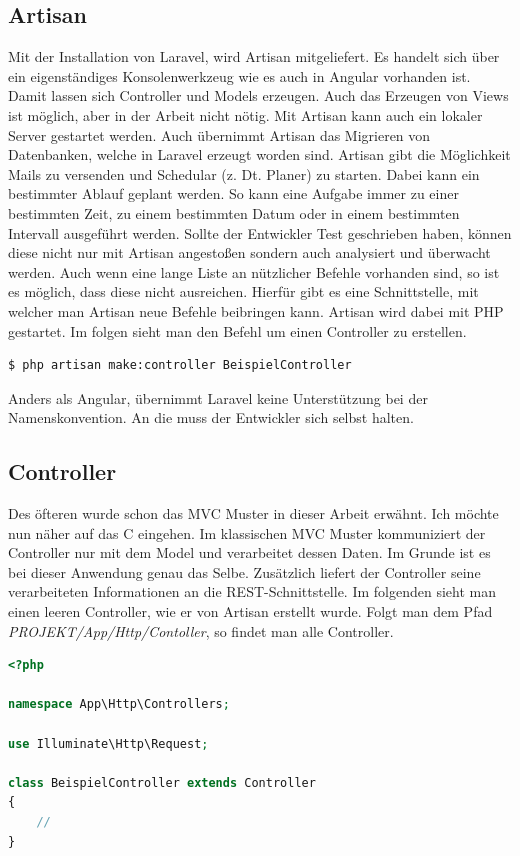 \subsection{Artisan}
Mit der Installation von Laravel, wird Artisan mitgeliefert. Es handelt sich über ein eigenständiges Konsolenwerkzeug wie es auch in Angular vorhanden ist. Damit lassen sich Controller und Models erzeugen. Auch das Erzeugen von Views ist möglich, aber in der Arbeit nicht nötig. Mit Artisan kann auch ein lokaler Server gestartet werden. Auch übernimmt Artisan das Migrieren von Datenbanken, welche in Laravel erzeugt worden sind. Artisan gibt die Möglichkeit Mails zu versenden und Schedular (\ac{z. Dt.} Planer) zu starten. Dabei kann ein bestimmter Ablauf geplant werden. So kann eine Aufgabe immer zu einer bestimmten Zeit, zu einem bestimmten Datum oder in einem bestimmten Intervall ausgeführt werden. Sollte der Entwickler Test geschrieben haben, können diese nicht nur mit Artisan angestoßen sondern auch analysiert und überwacht werden.  Auch wenn eine lange Liste an nützlicher Befehle vorhanden sind, so ist es möglich, dass diese nicht ausreichen. Hierfür gibt es eine Schnittstelle, mit welcher man Artisan neue Befehle beibringen kann.\autocite{Laravel.2018} Artisan wird dabei mit \ac{PHP} gestartet. Im folgen sieht man den Befehl um einen Controller zu erstellen.
\begin{lstlisting}[language=sh, frame=single]
$ php artisan make:controller BeispielController
\end{lstlisting}

Anders als Angular, übernimmt Laravel keine Unterstützung bei der Namenskonvention. An die muss der Entwickler sich selbst halten.

\subsection{Controller}
Des öfteren wurde schon das \ac{MVC} Muster in dieser Arbeit erwähnt. Ich möchte nun näher auf das C eingehen. Im klassischen \ac{MVC} Muster kommuniziert der Controller nur mit dem Model und verarbeitet dessen Daten. \autocite{Goll.2014} Im Grunde ist es bei dieser Anwendung genau das Selbe. Zusätzlich liefert der Controller seine verarbeiteten Informationen an die \ac{REST}-Schnittstelle. Im folgenden sieht man einen leeren Controller, wie er von Artisan erstellt wurde. Folgt man dem Pfad \textit{PROJEKT/App/Http/Contoller}, so findet man alle Controller.

\begin{lstlisting}[language=php, frame=single]
<?php

namespace App\Http\Controllers;

use Illuminate\Http\Request;

class BeispielController extends Controller
{
	//
}
\end{lstlisting}

